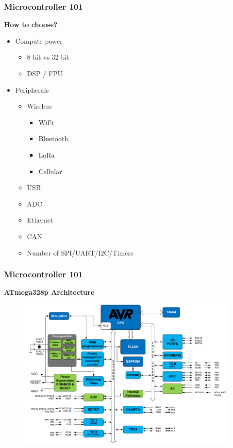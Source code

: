\documentclass[t]{beamer}
\begin{document}
\begin{frame}[t]
\frametitle{Microcontroller 101}

\textbf{How to choose?}
\begin{itemize}
	\item Compute power
	\begin{itemize}
		\item 8 bit vs 32 bit
		\item DSP / FPU
	\end{itemize} 
	\item Peripherals 
	\begin{itemize}
		\item Wireless
			\begin{itemize}
			\item WiFi
			\item Bluetooth
			\item LoRa
			\item Cellular
		\end{itemize} 
		\item USB
		\item ADC
		\item Ethernet
		\item CAN
		\item Number of SPI/UART/I2C/Timers
	\end{itemize} 
	
\end{itemize} 



\end{frame}


\begin{frame}[t]
\frametitle{Microcontroller 101}
\textbf{ATmega328p Architecture} 
\begin{figure}
	\includegraphics[scale=0.4]{328pArchitecture.png}
\end{figure}

\end{frame}
\end{document}
